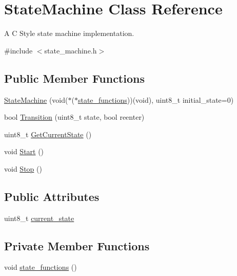 \hypertarget{class_state_machine}{}\section{State\+Machine Class Reference}
\label{class_state_machine}


A C Style state machine implementation.  




{\ttfamily \#include $<$state\+\_\+machine.\+h$>$}

\subsection*{Public Member Functions}
\begin{DoxyCompactItemize}
\item 
\hyperlink{class_state_machine_ad9c6bdaca444710f77fc12d7e1af8fdc}{State\+Machine} (void($\ast$($\ast$\hyperlink{class_state_machine_acc87359cd98c436f5b891ffe6cb67160}{state\+\_\+functions}))(void), uint8\+\_\+t initial\+\_\+state=0)
\item 
bool \hyperlink{class_state_machine_a1597799edc5a89006f164e52fd72d02b}{Transition} (uint8\+\_\+t state, bool reenter)
\item 
uint8\+\_\+t \hyperlink{class_state_machine_a62fd24666d16a2425c8397ce2d326dae}{Get\+Current\+State} ()
\item 
void \hyperlink{class_state_machine_a94c93f8203bab4f5a3784eba7445b582}{Start} ()
\item 
void \hyperlink{class_state_machine_a2eb142249e4c483c8a329b1a18b4383f}{Stop} ()
\end{DoxyCompactItemize}
\subsection*{Public Attributes}
\begin{DoxyCompactItemize}
\item 
uint8\+\_\+t \hyperlink{class_state_machine_abdcd9426d9a2ec9e2d703c74cd3299df}{current\+\_\+state}
\end{DoxyCompactItemize}
\subsection*{Private Member Functions}
\begin{DoxyCompactItemize}
\item 
void \hyperlink{class_state_machine_acc87359cd98c436f5b891ffe6cb67160}{state\+\_\+functions} ()
\end{DoxyCompactItemize}
